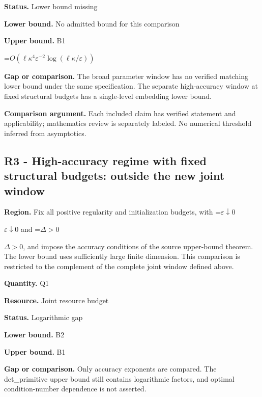 \documentclass[10pt,a4paper]{article}
\newcommand{\AtlasMath}[1]{\par\begingroup\centering\setbox0=\hbox{$\displaystyle #1$}\ifdim\wd0>1.4\linewidth\typeout{ATLAS WIDE FORMULA: \the\wd0}\fi\ifdim\wd0>\linewidth\resizebox{\linewidth}{!}{\box0}\else\box0\fi\par\endgroup}
\newcommand{\AtlasInlineMath}[1]{\begingroup\setbox0=\hbox{$#1$}\ifdim\wd0>.4\linewidth\endgroup\AtlasMath{#1}\else\endgroup$#1$\fi}
\begin{document}
\textbf{Status.} Lower bound missing



\textbf{Lower bound.} No admitted bound for this comparison



\textbf{Upper bound.} B1



\AtlasMath{O(\ell  \kappa ^4 \varepsilon ^{-2} \log(\ell \kappa /\varepsilon ))}


\textbf{Gap or comparison.} The broad parameter window has no verified matching lower bound under the same specification. The separate high-accuracy window at fixed structural budgets has a single-level embedding lower bound.



\textbf{Comparison argument.} Each included claim has verified statement and applicability; mathematics review is separately labeled. No numerical threshold inferred from asymptotics.



\subsection{R3 - High-accuracy regime with fixed structural budgets: outside the new joint window}


\textbf{Region.} Fix all positive regularity and initialization budgets, with \AtlasInlineMath{\varepsilon\downarrow0} and \AtlasInlineMath{\Delta>0}, and impose the accuracy conditions of the source upper-bound theorem. The lower bound uses sufficiently large finite dimension. This comparison is restricted to the complement of the complete joint window defined above.



\textbf{Quantity.} Q1



\textbf{Resource.} Joint resource budget



\textbf{Status.} Logarithmic gap



\textbf{Lower bound.} B2



\textbf{Upper bound.} B1



\textbf{Gap or comparison.} Only accuracy exponents are compared. The det\_primitive upper bound still contains logarithmic factors, and optimal condition-number dependence is not asserted.
\end{document}
